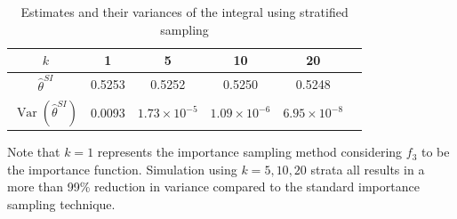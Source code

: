 \documentclass[11pt]{article}
\begin{document}
\begin{table}[h!]
\centering
\caption{Estimates and their variances of the integral using stratified sampling}\label{tab:3}
\begin{tabular}{cccccc}
\toprule
$k$ & 1 & 5 & 10 & 20\\
\midrule
$\widehat{\theta}^{SI}$ & 0.5253 & 0.5252 & 0.5250 & 0.5248\\
$\operatorname{Var}\left(\widehat{\theta}^{SI}\right)$ & 0.0093 & $1.73\times10^{-5}$ & $1.09\times10^{-6}$ & $6.95\times10^{-8}$\\
\bottomrule
\end{tabular}
\end{table}

Note that $k=1$ represents the importance sampling method considering $f_3$ to be the importance function. Simulation using $k=5, 10, 20$ strata all results in a more than 99\% reduction in variance compared to the standard importance sampling technique.
\end{document}
